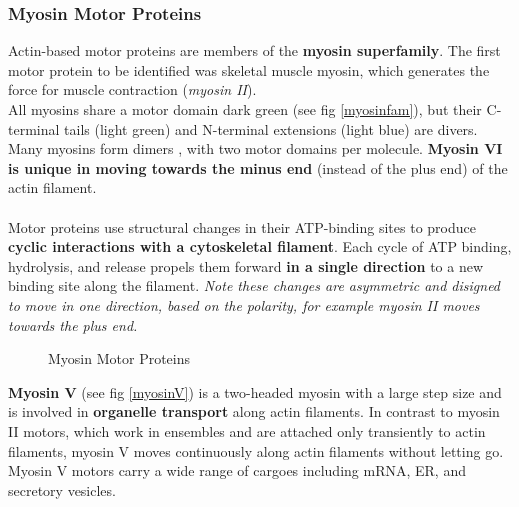 \documentclass[../main.tex]{subfiles}
\begin{document}
\subsubsection{Myosin Motor Proteins}
Actin-based motor proteins are members of the \textbf{myosin superfamily}. The first motor protein to be identified was skeletal muscle myosin, which generates the force for muscle contraction (\textit{myosin II}). \\
\indent All myosins share a motor domain dark green (see fig \ref{myosinfam}), but their C-terminal tails (light green) and N-terminal extensions (light blue) are divers. \\
\indent Many myosins form dimers , with two motor domains per molecule. \textbf{Myosin VI is unique in moving towards the minus end} (instead of the plus end) of the actin filament. \\
\\
Motor proteins use structural changes in their ATP-binding sites to produce \textbf{cyclic interactions with a cytoskeletal filament}. Each cycle of ATP binding, hydrolysis, and release propels them forward \textbf{in a single direction} to a new binding site along the filament. \textit{Note these changes are asymmetric and disigned to move in one direction, based on the polarity, for example myosin II moves towards the plus end.} 
\begin{figure}[H]
	\centering
	\caption{Myosin Motor Proteins}
\end{figure}
\indent \textbf{Myosin V} (see fig \ref{myosinV}) is a two-headed myosin with a large step size and is involved in \textbf{organelle transport} along actin filaments. In contrast to myosin II motors, which work in ensembles and are attached only transiently to actin filaments, myosin V moves continuously along actin  filaments without letting go. Myosin V motors carry a wide range of cargoes including mRNA, ER, and secretory vesicles. \\
\end{document}

